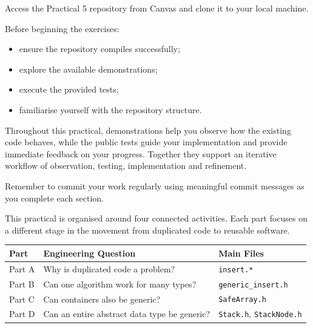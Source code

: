 \documentclass{csc2059practical}
\begin{document}


Access the Practical 5 repository from Canvas and clone it to your local
machine.

Before beginning the exercises:

\begin{itemize}

\item ensure the repository compiles successfully;

\item explore the available demonstrations;

\item execute the provided tests;

\item familiarise yourself with the repository structure.

\end{itemize}

Throughout this practical, demonstrations help you observe how the existing code
behaves, while the public tests guide your implementation and provide immediate
feedback on your progress. Together they support an iterative workflow of
observation, testing, implementation and refinement.

Remember to commit your work regularly using meaningful commit messages as you
complete each section.



This practical is organised around four connected activities. Each part focuses
on a different stage in the movement from duplicated code to reusable software.

\begin{center}
\begin{tabular}{lll}
\textbf{Part} & \textbf{Engineering Question} & \textbf{Main Files}\\
\hline
Part A & Why is duplicated code a problem? & \texttt{insert.*}\\
Part B & Can one algorithm work for many types? & \texttt{generic\_insert.h}\\
Part C & Can containers also be generic? & \texttt{SafeArray.h}\\
Part D & Can an entire abstract data type be generic? & \texttt{Stack.h}, \texttt{StackNode.h}\\
\end{tabular}
\end{center}
\end{document}
